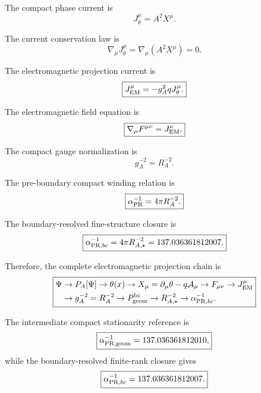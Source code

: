 \documentclass[11pt]{article}
\begin{document}
The compact phase current is
\begin{equation}
\boxed{
J_\theta^\mu
=
A^2X^\mu.
}
\end{equation}

The current conservation law is
\begin{equation}
\boxed{
\nabla_\mu J_\theta^\mu
=
\nabla_\mu(A^2X^\mu)
=
0.
}
\end{equation}

The electromagnetic projection current is
\begin{equation}
\boxed{
J_{\rm EM}^\mu
=
-g_A^2qJ_\theta^\mu.
}
\end{equation}

The electromagnetic field equation is
\begin{equation}
\boxed{
\nabla_\mu F^{\mu\nu}
=
J_{\rm EM}^\nu.
}
\end{equation}

The compact gauge normalization is
\begin{equation}
\boxed{
g_A^{-2}
=
R_A^{-2}.
}
\end{equation}

The pre-boundary compact winding relation is
\begin{equation}
\boxed{
\alpha_{\rm PR}^{-1}
=
4\pi R_A^{-2}.
}
\end{equation}

The boundary-resolved fine-structure closure is
\begin{equation}
\boxed{
\alpha_{{\rm PR},bc}^{-1}
=
4\pi R_{A,\star}^{-2}
=
137.036361812007.
}
\end{equation}

Therefore, the complete electromagnetic projection chain is
\begin{equation}
\boxed{
\begin{aligned}
\Psi
&\rightarrow
P_A[\Psi]
\rightarrow
\theta(x)
\rightarrow
X_\mu
=
\partial_\mu\theta
-
q\mathcal A_\mu
\rightarrow
F_{\mu\nu}
\rightarrow
J^\mu_{\rm EM}
\\
&\rightarrow
g_A^{-2}=R_A^{-2}
\rightarrow
P_{\rm geom}^{\rm bc}
\rightarrow
R_{A,\star}^{-2}
\rightarrow
\alpha_{{\rm PR},bc}^{-1}.
\end{aligned}
}
\end{equation}

The intermediate compact stationarity reference is
\begin{equation}
\boxed{
\alpha_{\rm PR,geom}^{-1}
=
137.036361812010,
}
\end{equation}
while the boundary-resolved finite-rank closure gives
\begin{equation}
\boxed{
\alpha_{{\rm PR},bc}^{-1}
=
137.036361812007.
}
\end{equation}
\end{document}
